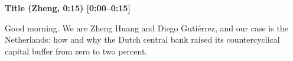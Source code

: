 {\small\textbf{Title (Zheng, 0:15) [0:00–0:15]}}\par\smallskip
Good morning. We are Zheng Huang and Diego Gutiérrez, and our case is the Netherlands: how and why the Dutch central bank raised its countercyclical capital buffer from zero to two percent.

